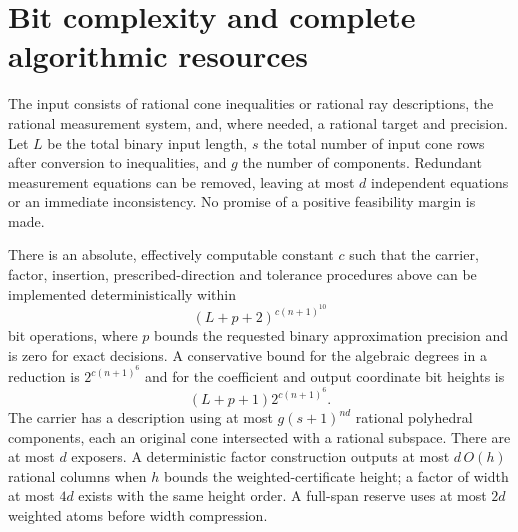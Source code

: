 \section{Bit complexity and complete algorithmic resources}\label{sec:complexity}
The input consists of rational cone inequalities or rational ray descriptions, the rational measurement system, and, where needed, a rational target and precision. Let $L$ be the total binary input length, $s$ the total number of input cone rows after conversion to inequalities, and $g$ the number of components. Redundant measurement equations can be removed, leaving at most $d$ independent equations or an immediate inconsistency. No promise of a positive feasibility margin is made.

\begin{theorem}\label{thm:complexity}
There is an absolute, effectively computable constant $c$ such that the carrier, factor, insertion, prescribed-direction and tolerance procedures above can be implemented deterministically within
\begin{equation}\label{eq:time}
 (L+p+2)^{c(n+1)^{10}}
\end{equation}
bit operations, where $p$ bounds the requested binary approximation precision and is zero for exact decisions. A conservative bound for the algebraic degrees in a reduction is $2^{c(n+1)^6}$ and for the coefficient and output coordinate bit heights is
\begin{equation}\label{eq:height}
 (L+p+1)2^{c(n+1)^6}.
\end{equation}
The carrier has a description using at most $g(s+1)^{nd}$ rational polyhedral components, each an original cone intersected with a rational subspace. There are at most $d$ exposers. A deterministic factor construction outputs at most $d\,O(h)$ rational columns when $h$ bounds the weighted-certificate height; a factor of width at most $4d$ exists with the same height order. A full-span reserve uses at most $2d$ weighted atoms before width compression.
\end{theorem}

